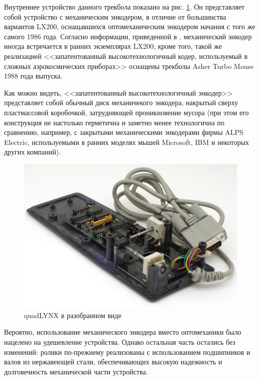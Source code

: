 \documentclass[11pt, a4paper]{article}
\begin{document}
Внутреннее устройство данного трекбола показано на рис. \ref{fig:quadLYNXInside}. Он представляет собой устройство с механическим энкодером, в отличие от большинства вариантов LX200, оснащавшихся оптомеханическим энкодером начания с того же самого 1986 года. Согласно информации, приведенной в \cite{lx200}, механический энкодер иногда встречается в ранних экземплярах LX200;  кроме того, такой же реализацией <<запатентованный высокотехнологичный кодер, используемый в сложных аэрокосмических приборах>> \cite{turbo} оснащены трекболы Asher Turbo Mouse 1988 года выпуска. 

Как можно видеть, <<запатентованный высокотехнологичный энкодер>> представляет собой обычный диск механичекого энкодера, накрытый сверху пластмассовой коробочкой, затрудняющей проникновение мусора (при этом его конструкция не настолько герметична и заметно менее технологична по сравнению, например, с закрытыми механическими энкодерами фирмы ALPS Electric, используемыми в ранних моделях мышей Microsoft, IBM и некоторых других компаний).

\begin{figure}[h]
    \centering
    \includegraphics[scale=0.6]{1986_honeywell_asher_quadlynx_trackball/inside_30.jpg}
    \caption{quadLYNX в разобранном виде}
    \label{fig:quadLYNXInside}
\end{figure}

Вероятно, использование механического энкодера вместо оптомеханики было нацелено на удешевление устройства. Однако остальная часть остались без изменений: ролики по-прежнему реализованы с использованием подшипников и валов из нержавеющей стали, обеспечивающих высокую надежность и долговечность механической части устройства.
\end{document}
